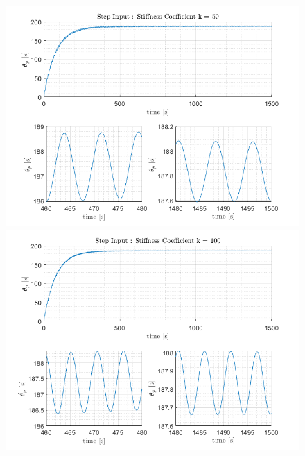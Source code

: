 \documentclass[letterpaper,12pt]{article}
\begin{document}
\begin{figure}[ht]
    \centering
    \includegraphics[scale = .8]{Images/StepInput_k50.png}
    \includegraphics[scale = .8]{Images/StepInput_k100.png}
\end{figure}
\end{document}
